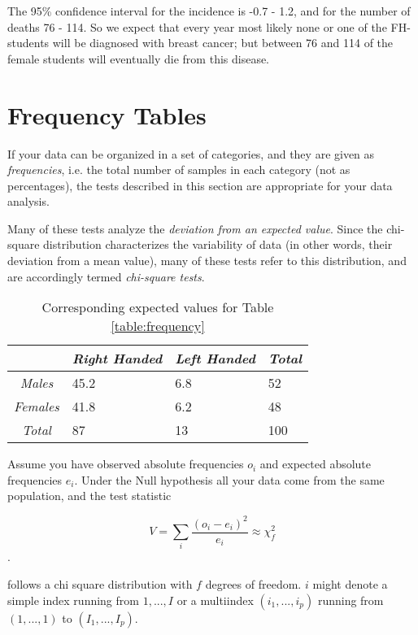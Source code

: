 The 95\% confidence interval for the incidence is -0.7 - 1.2, and for the number of deaths 76 - 114. So we expect that every year most likely none or one of the FH-students will be diagnosed with breast cancer; but between 76 and 114 of the female students will eventually die from this disease.

\section{Frequency Tables} 

If your data can be organized in a set of categories, and they are given as \emph{frequencies}, i.e. the total number of samples in each category (not as percentages), the tests described in this section are appropriate for your data analysis.

Many of these tests analyze the \emph{deviation from an expected value}. Since the chi-square distribution characterizes the variability of data (in other words, their deviation from a mean value), many of these tests refer to this distribution, and are accordingly termed \emph{chi-square tests}.

\begin{table}
  \centering
  \begin{tabular}{|c|l l l|}
  \hline
  & \emph{Right Handed} & \emph{Left Handed} & \emph{Total} \\
  \hline
  \emph{Males} & 45.2 & 6.8 & 52 \\
  \emph{Females} & 41.8 & 6.2 & 48 \\
  \emph{Total} & 87 & 13 & 100 \\
  \hline
  \end{tabular}

  \caption{Corresponding expected values for Table \ref{table:frequency}\label{table:expectedValues}}
\end{table}


Assume you have observed absolute frequencies $o_i$ and expected absolute frequencies $e_i$. Under the Null hypothesis all your data come from the same population, and the test statistic

\begin{equation}\label{eq:chi2}
  V = \sum_i \frac{(o_i-e_i)^2}{e_i} \approx \chi^2_f
\end{equation}.

follows a chi square distribution with $f$ degrees of freedom. $i$ might denote a simple index running from $1,...,I$ or a multiindex $(i_1,...,i_p)$ running from $(1,...,1)$ to $(I_1,...,I_p)$.

